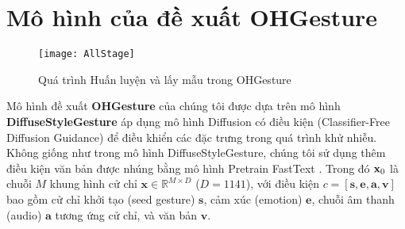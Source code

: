 


\pagebreak

\section{Mô hình của đề xuất OHGesture}
\label{sec:ohgesture}



\begin{figure}[H]
	\centering
	\texttt{[image: AllStage]}
	\caption{Quá trình Huấn luyện và lấy mẫu trong OHGesture}
	\label{fig:TrainingAndSampling}
\end{figure}

Mô hình đề xuất \textbf{OHGesture} của chúng tôi được dựa trên mô hình \textbf{DiffuseStyleGesture} \cite{yang2023diffusestylegesture} áp dụng mô hình Diffusion \cite{ho2020denoising} có điều kiện \cite{ho2022classifier} (Classifier-Free Diffusion Guidance) để điều khiển các đặc trưng trong quá trình khử nhiễu. 
Không giống như trong mô hình DiffuseStyleGesture, chúng tôi sử dụng thêm điều kiện văn bản được nhúng bằng mô hình Pretrain FastText  \cite{bojanowski2017enriching}.
Trong đó $\mathbf{x}_0$ là chuỗi $M$ khung hình cử chỉ $\mathbf{x} \in \mathbb{R}^{M \times D}$ ($D = 1141$), với điều kiện $c = [\mathbf{s}, \mathbf{e}, \mathbf{a}, \mathbf{v}]$ bao gồm cử chỉ khởi tạo (seed gesture) $\mathbf{s}$,  cảm xúc (emotion) $\mathbf{e}$, chuỗi âm thanh (audio) $\mathbf{a}$ tương ứng cử chỉ, và văn bản  $\mathbf{v}$.


